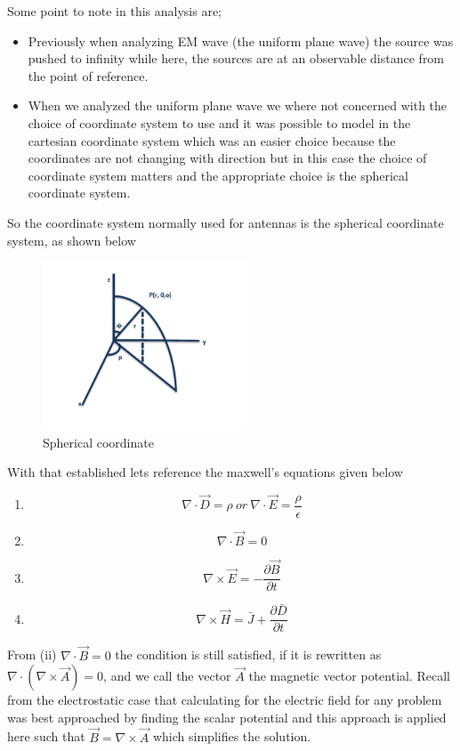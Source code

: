 Some point to note in this analysis are;
\begin{itemize}
\item Previously when analyzing EM wave (the uniform plane wave) the source was pushed to infinity while here, the sources are at an observable distance from the point of reference.
\item When we analyzed the uniform plane wave we where not concerned with the choice of coordinate system to use and it was possible to model in the cartesian coordinate system which was an easier choice because the coordinates are not changing with direction but in this case the choice of coordinate system matters and the appropriate choice is the spherical coordinate system.
\end{itemize}

So the coordinate system normally used for antennas is the spherical coordinate system, as shown below

\begin{figure}
\centering
\includegraphics[height=5cm]{./graphics/fig_5}
\caption{Spherical coordinate}
\end{figure}

With that established lets reference the maxwell's equations given below
\begin{enumerate}
\item $$ \nabla\cdot\vec{D} =\rho\ or\ \nabla \cdot\vec{E} =\dfrac{\rho}{\epsilon} $$	
\item $$ \nabla\cdot\vec{B}=0$$	
\item $$\nabla\times\vec{E}=- \dfrac{\partial\vec{B}}{\partial t}$$
\item $$\nabla\times\vec{H}=\bar{J}+\dfrac{\partial\bar{D}}{\partial t}$$
\end{enumerate}

From (ii) $\nabla\cdot\vec{B}=0$ the condition is still satisfied, if it is rewritten as $\nabla\cdot(\nabla\times\vec{A})=0$, and we call the vector $\vec{A}$ the magnetic vector potential. Recall from the electrostatic case that calculating for the electric field for any problem was best approached by finding the scalar potential and this approach is applied here such that $\vec{B}=\nabla\times\vec{A}$ which simplifies the solution.

